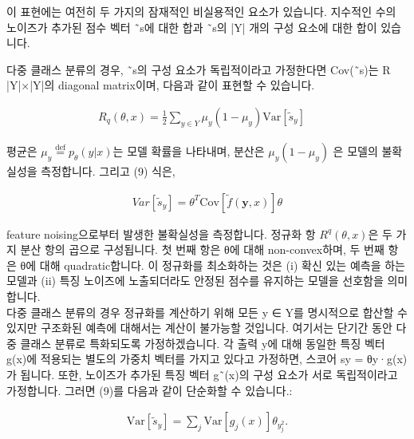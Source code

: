 \documentclass{article}
\begin{document}
이 표현에는 여전히 두 가지의 잠재적인 비실용적인 요소가 있습니다. 지수적인 수의 노이즈가 추가된 점수 벡터 ˜s에 대한 합과 ˜s의 |Y| 개의 구성 요소에 대한 합이 있습니다.

다중 클래스 분류의 경우, ˜s의 구성 요소가 독립적이라고 가정한다면 Cov(˜s)는 R |Y|×|Y|의 diagonal matrix이며, 다음과 같이 표현할 수 있습니다.

\begin{align}
R_q(\theta, x) = \frac{1}{2} \sum_{y \in Y} \mu_y(1 - \mu_y) \text{Var}[\tilde{s}_y] \quad
\end{align}

평균은 $\mu_y \stackrel{\text{def}}{=} p_{\theta}(y \vert x)$는 모델 확률을 나타내며, 분산은 $\mu_y(1-\mu_y)$ 은 모델의 불확실성을 측정합니다. 그리고 (9) 식은,

\begin{align}
    Var[\tilde{s}_y] = \theta^T \text{Cov}[\tilde{f}(\textbf{y}, x)]\theta
\end{align}

feature noising으로부터 발생한 불확실성을 측정합니다. 정규화 항 $R^q(θ, x)$은 두 가지 분산 항의 곱으로 구성됩니다. 첫 번째 항은 θ에 대해 non-convex하며, 두 번째 항은 θ에 대해 quadratic합니다. 이 정규화를 최소화하는 것은 (i) 확신 있는 예측을 하는 모델과 (ii) 특징 노이즈에 노출되더라도 안정된 점수를 유지하는 모델을 선호함을 의미합니다.\\

다중 클래스 분류의 경우 정규화를 계산하기 위해 모든 y ∈ Y를 명시적으로 합산할 수 있지만 구조화된 예측에 대해서는 계산이 불가능할 것입니다. 여기서는 단기간 동안 다중 클래스 분류로 특화되도록 가정하겠습니다. 각 출력 y에 대해 동일한 특징 벡터 g(x)에 적용되는 별도의 가중치 벡터를 가지고 있다고 가정하면, 스코어 sy = θy·g(x)가 됩니다. 또한, 노이즈가 추가된 특징 벡터 g˜(x)의 구성 요소가 서로 독립적이라고 가정합니다. 그러면 (9)를 다음과 같이 단순화할 수 있습니다.:

\begin{align}
    \text{Var}[\tilde{s}_y] = \sum_j \text{Var}[g_j(x)]\theta_y_j^2.
\end{align}
\end{document}
